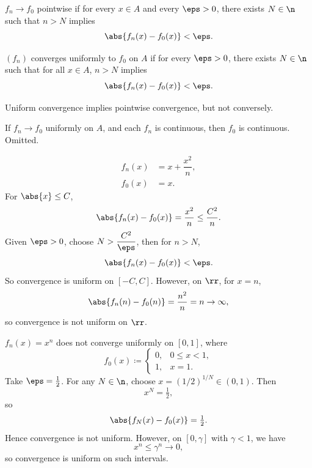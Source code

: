 \begin{definition}
    $f_n \to f_0$ pointwise if for every $x\in A$ and every $\eps > 0$, there exists $N\in\n$ such that $n > N$ implies
    \[
        \abs{f_n(x) - f_0(x)} < \eps.
    \]
\end{definition}

\begin{definition}
    $(f_n)$ converges uniformly to $f_0$ on $A$ if for every $\eps > 0$, there exists $N\in\n$ such that for all $x\in A$, $n > N$ implies
    \[
        \abs{f_n(x) - f_0(x)} < \eps.
    \]
\end{definition}

\begin{corollary}
    Uniform convergence implies pointwise convergence, but not conversely.
\end{corollary}

\begin{theorem}{
    If $f_n \to f_0$ uniformly on $A$, and each $f_n$ is continuous, then $f_0$ is continuous.
}
    Omitted.
\end{theorem}

\begin{problem}{
    \begin{align*}
        f_n(x) &= x + \dfrac{x^2}{n},\\
        f_0(x) &= x.
    \end{align*}
}
    For $\abs{x} \leq C$,
    \[
        \abs{f_n(x) - f_0(x)} = \dfrac{x^2}{n} \leq \dfrac{C^2}{n}.
    \]
    Given $\eps > 0$, choose $N > \dfrac{C^2}{\eps}$, then for $n > N$,
    \[
        \abs{f_n(x) - f_0(x)} < \eps.
    \]
    So convergence is uniform on $[-C,C]$.
    However, on $\rr$, for $x=n$,
    \[
        \abs{f_n(n) - f_0(n)} = \dfrac{n^2}{n} = n \to \infty,
    \]
    so convergence is not uniform on $\rr$.
\end{problem}

\begin{problem}{
    $f_n(x) = x^n$ does not converge uniformly on $[0,1]$, where
    \[
        f_0(x) \coloneqq
        \begin{cases}
            0, & 0 \leq x < 1,\\
            1, & x = 1.
        \end{cases}
    \]
}
    Take $\eps = \tfrac{1}{2}$.
    For any $N\in\n$, choose $x = (1/2)^{1/N} \in (0,1)$.
    Then
    \[
        x^N = \tfrac{1}{2},
    \]
    so
    \[
        \abs{f_N(x) - f_0(x)} = \tfrac{1}{2}.
    \]
    Hence convergence is not uniform.
    However, on $[0,\gamma]$ with $\gamma < 1$, we have
    \[
        x^n \leq \gamma^n \to 0,
    \]
    so convergence is uniform on such intervals.
\end{problem}